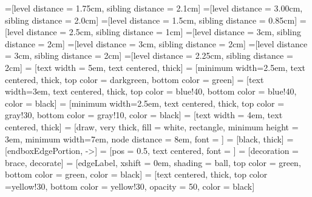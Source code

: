 =[level distance = 1.75cm, sibling distance = 2.1cm]
=[level distance = 3.00cm, sibling distance = 2.0cm]
=[level distance = 1.5cm, sibling distance = 0.85cm]
=[level distance = 2.5cm, sibling distance = 1cm]
=[level distance = 3cm, sibling distance = 2cm]
=[level distance = 3cm, sibling distance = 2cm]
=[level distance = 3cm, sibling distance = 2cm]
=[level distance = 2.25cm, sibling distance = 2cm]
 = [text width = 5em, text centered, thick]
 = [minimum width=2.5em, text centered, thick, top color = darkgreen, bottom color = green]
 = [text width=3em, text centered, thick, top color = blue!40, bottom color = blue!40, color = black] 
 = [minimum width=2.5em, text centered, thick, top color = gray!30, bottom color = gray!10, color = black]
 = [text width = 4em, text centered, thick]
 = [draw, very thick, fill = white, rectangle, 
	minimum height = 3em, minimum width=7em, 
	node distance = 8em, font = {\sffamily\bfseries}]
 = [black, thick]
 = [endboxEdgePortion, ->]
 = [pos = 0.5, text centered, font = {\sffamily\small}]
 = [decoration = {brace}, decorate]
 = [edgeLabel, xshift = 0em, shading = ball,
				top color = green, bottom color = green, color = black]
 = [text centered, thick, top color =yellow!30, 
				bottom color = yellow!30, opacity = 50, color = black]
